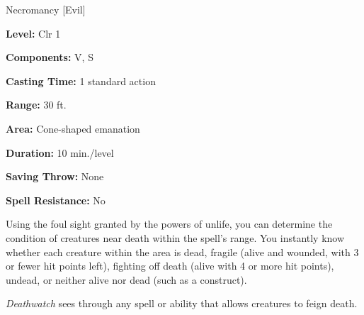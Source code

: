 
Necromancy [Evil]

\textbf{Level:} Clr 1

\textbf{Components:} V, S

\textbf{Casting Time:} 1 standard action

\textbf{Range:} 30 ft.

\textbf{Area:} Cone-shaped emanation

\textbf{Duration:} 10 min./level

\textbf{Saving Throw:} None

\textbf{Spell Resistance:} No

Using the foul sight granted by the powers of unlife, you can determine the condition 
of creatures near death within the spell's range. You instantly know whether each 
creature within the area is dead, fragile (alive and wounded, with 3 or fewer hit 
points left), fighting off death (alive with 4 or more hit points), undead, or 
neither alive nor dead (such as a construct).

\textit{Deathwatch} sees through any spell or ability that allows creatures to 
feign death.

